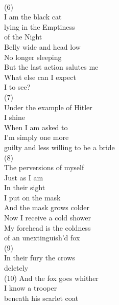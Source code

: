 \documentclass[smalldemyvopaper,11pt,twoside,onecolumn,openright,extrafontsizes]{memoir}
\begin{document}
\\(6)
\\I am the black cat
\\lying in the Emptiness
\\of the Night
\\Belly wide and head low
\\No longer sleeping
\\But the last action salutes me
\\What else can I expect
\\I to see?
\\(7)
\\Under the example of Hitler
\\I shine
\\When I am asked to
\\I'm simply one more
\\guilty and less willing to be a bride
\\(8)
\\The perversions of myself
\\Just as I am
\\In their sight
\\I put on the mask
\\And the mask grows colder
\\Now I receive a cold shower
\\My forehead is the coldness
\\of an unextinguish'd fox
\\(9)
\\In their fury the crows
\\deletely
\\(10) And the fox goes whither
\\I know a trooper
\\beneath his scarlet coat
\end{document}
